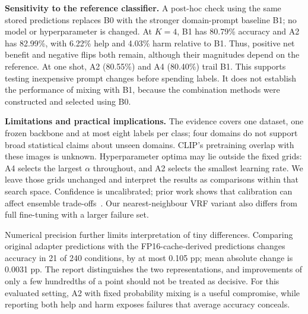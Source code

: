 \textbf{Sensitivity to the reference classifier.}
A post-hoc check using the same stored predictions replaces B0 with the stronger domain-prompt baseline B1; no model or hyperparameter is changed. At $K=4$, B1 has 80.79\% accuracy and A2 has 82.99\%, with 6.22\% help and 4.03\% harm relative to B1. Thus, positive net benefit and negative flips both remain, although their magnitudes depend on the reference. At one shot, A2 (80.55\%) and A4 (80.40\%) trail B1. This supports testing inexpensive prompt changes before spending labels. It does not establish the performance of mixing with B1, because the combination methods were constructed and selected using B0.

\textbf{Limitations and practical implications.}
The evidence covers one dataset, one frozen backbone and at most eight labels per class; four domains do not support broad statistical claims about unseen domains. CLIP's pretraining overlap with these images is unknown. Hyperparameter optima may lie outside the fixed grids: A4 selects the largest $\alpha$ throughout, and A2 selects the smallest learning rate. We leave those grids unchanged and interpret the results as comparisons within that search space. Confidence is uncalibrated; prior work shows that calibration can affect ensemble trade-offs~\citep{kumar2022calibrated}. Our nearest-neighbour VRF variant also differs from full fine-tuning with a larger failure set.

Numerical precision further limits interpretation of tiny differences. Comparing original adapter predictions with the FP16-cache-derived predictions changes accuracy in 21 of 240 conditions, by at most 0.105 pp; mean absolute change is 0.0031 pp. The report distinguishes the two representations, and improvements of only a few hundredths of a point should not be treated as decisive. For this evaluated setting, A2 with fixed probability mixing is a useful compromise, while reporting both help and harm exposes failures that average accuracy conceals.

